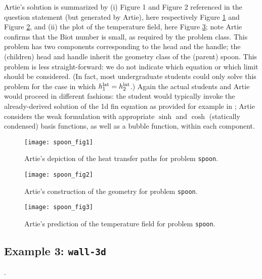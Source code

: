 \documentclass[preprint,12pt]{article}
\begin{document}
Artie's solution is summarized by (i) Figure 1 and Figure 2 referenced in the question statement (but generated by Artie), here respectively Figure \ref{fig:spoon_fig1} and Figure \ref{fig:spoon_fig2}, and (ii) the plot of the temperature field, here Figure \ref{fig:spoon_fig3}; note Artie confirms that the Biot number is small, as required by the problem class. This problem has two components corresponding to the head and the handle; the (children) head and handle inherit the geometry class of the (parent) spoon. This problem is less straight-forward: we do not indicate which equation or which limit should be considered. (In fact, most undergraduate students could only solve this problem for the case in which $h_1^{\rm lat} = h_2^{\rm lat}$.)  Again the actual students and Artie would proceed in different fashions: the student would typically invoke the already-derived solution of the 1d fin equation as provided for example in \cite{Lienhard}; Artie considers the weak formulation with appropriate $\sinh$ and $\cosh$ (statically condensed) basis functions, as well as a bubble function, within each component.

\begin{figure}[h!]
\begin{center}
 \texttt{[image: spoon\_fig1]}
\end{center}
\caption{Artie's depiction of the heat transfer paths for problem \texttt{spoon}.}
\label{fig:spoon_fig1}
\end{figure}

\begin{figure}[h!]
\begin{center}
 \texttt{[image: spoon\_fig2]}
\end{center}
\caption{Artie's construction of the geometry for problem \texttt{spoon}.}
\label{fig:spoon_fig2}
\end{figure}

\begin{figure}[h!]
\begin{center}
 \texttt{[image: spoon\_fig3]}
\end{center}
\caption{Artie's prediction of the temperature field for problem \texttt{spoon}.}
\label{fig:spoon_fig3}
\end{figure}

\subsection{Example 3: \texttt{wall-3d}}. 
\end{document}
